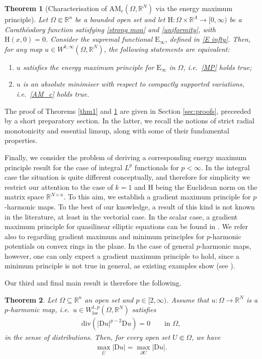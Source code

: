 \documentclass[a4paper,11pt]{article}
\numberwithin{equation}{section}
\newtheorem{Theorem}{Theorem}[section]
\newcommand{\numberset}{\mathbb}
\newcommand{\Om}{\Omega}
\newcommand{\R}{\numberset{R}}
\newcommand{\rom}{\mathrm}
\theoremstyle{definition}
\begin{document}
\begin{Theorem}[Characterisation of $\mathrm {AM}_c(\Om,\R^N)$ via the energy maximum principle]\label{thm2}
Let $\Om\Subset\R^n$ be a bounded open set and let $\rom{H}:\Om\times\R^\Lambda\longrightarrow [0,\infty)$ be a Carathéodory function satisfying \eqref{strong mon} and \eqref{uniformity}, with $\rom{H}(x,0)=0$. Consider the supremal  functional $\mathrm E_\infty$, defined in \eqref{E infty}.
Then, for any map $u\in W^{k,\infty}(\Om,\R^N)$, the following statements are equivalent:
\begin{enumerate}
\item[(i)] $u$ satisfies the energy maximum principle for $\mathrm E_\infty$ in $\Om$, i.e.\ \eqref{MP} holds true;
\item[(ii)] $u$ is an absolute minimiser with respect to compactly supported variations, i.e.\ \eqref{AM_c} holds true.
\end{enumerate}
\end{Theorem}
The proof of Theorems \ref{thm1} and \ref{thm2} are given in Section \ref{sec:proofs}, preceeded by a short preparatory section. In the latter, we recall the notions of strict radial monotonicity and essential limsup, along with some of their fundamental properties. 

Finally, we consider the problem of deriving a corresponding energy maximum principle result for the case of integral $L^p$ functionals for $p<\infty$. In the integral case the situation is quite different conceptually, and therefore for simplicity we restrict our attention to the case of $k=1$ and $\mathrm H$ being the Euclidean norm on the matrix space $\R^{N \times n}$. To this aim, we establish a gradient maximum principle for $p$-harmonic maps. To the best of our  knowledge, a result of this kind is not known in the literature, at least in the vectorial case. In the scalar case, a gradient maximum principle for quasilinear elliptic equations can be found in \cite[Chapter 15]{GT}. We refer also to \cite[Appendix B]{PZZ} regarding gradient maximum and minimum principles for $p$-harmonic potentials on convex rings in the plane. In the case of general $p$-harmonic maps, however, one can only expect a gradient maximum principle to hold, since a minimum principle is not true in general, as existing examples show (see \cite{BBDS}).

Our third and final main result is therefore the following.

\begin{Theorem}\label{thm p}
Let $\Om\subseteq\R^n$ an open set and $p\in[2,\infty)$. Assume that $u:\Om\longrightarrow \R^N$ is a $p$-harmonic map, i.e.\ $u\in W^{1,p}_{\mathrm{loc}}(\Om,\R^N)$ satisfies
\begin{align}\label{p eq}
\mathrm{div} (|\rom Du|^{p-2}\rom Du)=0\qquad\mbox{in }\Om,
\end{align}
in the sense of distributions. Then, for every open set $U\Subset\Om$, we have
\begin{align}\label{GMP}
\max_{\overline U}|\rom Du|=\max_{\partial U}|\rom Du|.
\end{align}
\end{Theorem}
\end{document}
